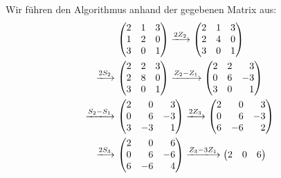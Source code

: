 Wir führen den Algorithmus anhand der gegebenen Matrix aus:
\begin{align*}
  &\,
  \begin{pmatrix}
    2 & 1 & 3 \\ 
    1 & 2 & 0 \\
    3 & 0 & 1 \\
  \end{pmatrix}
  \xlongrightarrow{2 Z_2}
  \begin{pmatrix}
    2 & 1 & 3 \\ 
    2 & 4 & 0 \\
    3 & 0 & 1 \\
  \end{pmatrix}
  \\
  \xlongrightarrow{2 S_2}&\,
  \begin{pmatrix}
    2 & 2 & 3 \\ 
    2 & 8 & 0 \\
    3 & 0 & 1 \\
  \end{pmatrix}
  \xlongrightarrow{Z_2 - Z_1}
  \begin{pmatrix*}[r]
    2 & 2 &  3  \\ 
    0 & 6 & -3  \\
    3 & 0 &  1  \\
  \end{pmatrix*}
  \\
  \xlongrightarrow{S_2 - S_1}&\,
  \begin{pmatrix*}[r]
    2 &  0  &  3  \\ 
    0 &  6  & -3  \\
    3 & -3  &  1  \\
  \end{pmatrix*}
  \xlongrightarrow{2 Z_3}
  \begin{pmatrix*}[r]
    2 &  0  &  3  \\ 
    0 &  6  & -3  \\
    6 & -6  &  2  \\
  \end{pmatrix*}
  \\
  \xlongrightarrow{2 S_3}&\,
  \begin{pmatrix*}[r]
    2 &  0  &  6  \\ 
    0 &  6  & -6  \\
    6 & -6  &  4  \\
  \end{pmatrix*}
  \xlongrightarrow{Z_3 - 3 Z_1}
  \begin{pmatrix*}[r]
    2 &  0  &   6 \\ 

\end{pmatrix*}
\end{align*}
